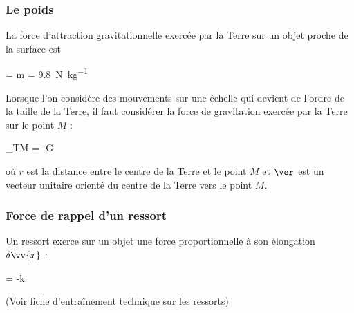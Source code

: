 \documentclass{cours}
\begin{document}
\subsubsection{Le poids}%
\label{ssub:le_poids}

La force d'attraction gravitationnelle exercée par la Terre sur un objet proche de la surface est 
\begin{eqencadre}
 = m  \quad {}\quad {} = \SI{9.8}{\newton\per\kilo\gram}
\end{eqencadre}

Lorsque l'on considère des mouvements sur une échelle qui devient de l'ordre de la taille de la Terre, il faut considérer la force de gravitation exercée par la Terre sur le point $M$ :
\begin{eqencadre}
_{T\rightarrow M} = -G\ver
\end{eqencadre}
où $r$ est la distance entre le centre de la Terre et le point $M$ et $\ver$ est un vecteur unitaire orienté du centre de la Terre vers le point $M$. 

\subsubsection{Force de rappel d'un ressort}%
\label{ssub:force_de_rappel_d_un_ressort}

Un ressort exerce sur un objet une force proportionnelle à son élongation $\delta \vv{x}$ : 
\begin{center}
\end{center}
\begin{eqencadre}
 = -k\delta {}
\end{eqencadre}
(Voir fiche d'entraînement technique sur les ressorts)
\end{document}
